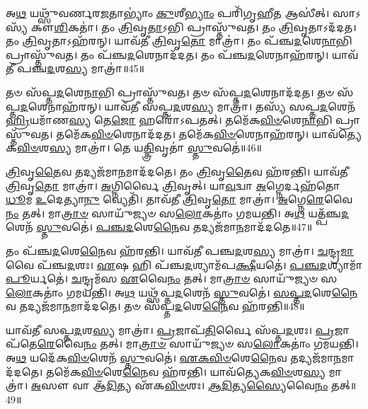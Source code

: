 𑌅\-\ul{𑌥} 𑌯𑌥𑍍𑌸𑍁᳴𑌵𑌰𑍍𑌣𑌰\-\ul{𑌜}\-𑌤𑌾𑌭𑍍𑌯𑌾𑌂॑ \ul{𑌕𑍁}\-𑌶𑍀\-\ul{𑌭𑍍𑌯𑌾𑌂} 𑌪𑌰𑌿᳴𑌗𑍃𑌹𑍀\-\ul{𑌤} 𑌆𑌸𑍀॑𑌤𑍍।
𑌸𑌾𑌽𑌸𑍍𑌯᳴ 𑌕𑍗\-\ul{𑌶𑌿}\-𑌕𑌤𑌾॑।
𑌤𑌂 \ul{𑌤𑍍𑌰𑌿}\-𑌵𑍃\-\ul{𑌤𑌾}\-𑌽𑌭𑌿 𑌪𑍍𑌰𑌾𑌸𑍍𑌤𑍁᳴𑌵𑌤।
𑌤𑌂 \ul{𑌤𑍍𑌰𑌿}\-𑌵𑍃𑌤𑌾\-𑌽𑌦᳴𑌦𑌤।
𑌤𑌂 \ul{𑌤𑍍𑌰𑌿}\-𑌵𑍃𑌤𑌾\-𑌽𑌹᳴𑌰𑌨𑍍।
𑌯𑌾𑌵᳴𑌤𑍀 \ul{𑌤𑍍𑌰𑌿}\-𑌵𑍃\-\ul{𑌤𑍋} 𑌮𑌾𑌤𑍍𑌰𑌾॑।
𑌤𑌂 𑌪᳴𑌞𑍍𑌚\-\ul{𑌦}\-𑌶𑍇\-\ul{𑌨𑌾}\-𑌭𑌿 𑌪𑍍𑌰𑌾𑌸𑍍𑌤𑍁᳴𑌵𑌤।
𑌤𑌂 𑌪᳴𑌞𑍍𑌚\-\ul{𑌦}\-𑌶𑍇𑌨𑌾𑌦᳴𑌦𑌤।
𑌤𑌂 𑌪᳴𑌞𑍍𑌚\-\ul{𑌦}\-𑌶𑍇𑌨𑌾𑌹᳴𑌰𑌨𑍍।
𑌯𑌾𑌵᳴𑌤𑍀 𑌪𑌞𑍍𑌚\-\ul{𑌦}\-𑌶\-\ul{𑌸𑍍𑌯} 𑌮𑌾𑌤𑍍𑌰𑌾॑॥45॥

𑌤𑍞 𑌸᳴𑌪𑍍𑌤\-\ul{𑌦}\-𑌶𑍇\-\ul{𑌨𑌾}\-𑌭𑌿 𑌪𑍍𑌰𑌾𑌸𑍍𑌤𑍁᳴𑌵𑌤।
𑌤𑍞 𑌸᳴𑌪𑍍𑌤\-\ul{𑌦}\-𑌶𑍇𑌨𑌾𑌦᳴𑌦𑌤।
𑌤𑍞 𑌸᳴𑌪𑍍𑌤\-\ul{𑌦}\-𑌶𑍇𑌨𑌾𑌹᳴𑌰𑌨𑍍।
𑌯𑌾𑌵᳴𑌤𑍀 𑌸𑌪𑍍𑌤\-\ul{𑌦}\-𑌶\-\ul{𑌸𑍍𑌯} 𑌮𑌾𑌤𑍍𑌰𑌾॑।
𑌤𑌸𑍍𑌯᳴ 𑌸𑌪𑍍𑌤\-\ul{𑌦}\-𑌶𑍇𑌨᳴ \ul{𑌹𑍍𑌰𑌿}\-𑌯𑌮𑌾᳴𑌣\-\ul{𑌸𑍍𑌯} 𑌤𑍇\-\ul{𑌜𑍋} 𑌹𑌰𑍋᳴\-𑌽𑌪𑌤𑌤𑍍।
𑌤𑌮𑍇᳴𑌕\-\ul{𑌵𑌿}\-\-\ul{𑍞}\-𑌶𑍇\-\ul{𑌨𑌾}\-𑌭𑌿 𑌪𑍍𑌰𑌾𑌸𑍍𑌤𑍁᳴𑌵𑌤।
𑌤𑌮𑍇᳴𑌕\-\ul{𑌵𑌿}\-\-\ul{𑍞}\-𑌶𑍇𑌨𑌾𑌦᳴𑌦𑌤।
𑌤𑌮𑍇᳴𑌕\-\ul{𑌵𑌿}\-\-\ul{𑍞}\-𑌶𑍇𑌨𑌾𑌹᳴𑌰𑌨𑍍।
𑌯𑌾𑌵᳴𑌤𑍍𑌯𑍇𑌕\-\ul{𑌵𑌿}\-\-\ul{𑍞}\-𑌶\-\ul{𑌸𑍍𑌯} 𑌮𑌾𑌤𑍍𑌰𑌾॑।
𑌤𑍇 𑌯\-\ul{𑌤𑍍𑌤𑍍𑌰𑌿}\-𑌵𑍃𑌤𑌾॑ \ul{𑌸𑍍𑌤𑍁}\-𑌵𑌤𑍇॑॥46॥

\-\ul{𑌤𑍍𑌰𑌿}\-𑌵𑍃\-\ul{𑌤𑍈}\-𑌵 𑌤𑌦𑍍𑌯𑌜᳴𑌮𑌾\-\ul{𑌨}\-𑌮𑌾𑌦᳴𑌦𑌤𑍇।
𑌤𑌂 \ul{𑌤𑍍𑌰𑌿}\-𑌵𑍃\-\ul{𑌤𑍈}\-𑌵 𑌹᳴𑌰𑌨𑍍𑌤𑌿।
𑌯𑌾𑌵᳴𑌤𑍀 \ul{𑌤𑍍𑌰𑌿}\-𑌵𑍃\-\ul{𑌤𑍋} 𑌮𑌾𑌤𑍍𑌰𑌾॑।
\-\ul{𑌅}\-𑌗𑍍𑌨𑌿𑌰𑍍𑌵𑍈 \ul{𑌤𑍍𑌰𑌿}\-𑌵𑍃𑌤𑍍।
𑌯𑌾\-\ul{𑌵}\-𑌦𑍍𑌵𑌾 \ul{𑌅}\-𑌗𑍍𑌨𑍇𑌰𑍍𑌦𑌹᳴𑌤𑍋 \ul{𑌧𑍂}\-𑌮 \ul{𑌉}\-𑌦𑍇𑌤𑍍𑌯𑌾\-\ul{𑌨𑍁} 𑌵𑍍𑌯𑍇𑌤𑌿᳴।
𑌤𑌾𑌵᳴𑌤𑍀 \ul{𑌤𑍍𑌰𑌿}\-𑌵𑍃\-\ul{𑌤𑍋} 𑌮𑌾𑌤𑍍𑌰𑌾॑।
\-\ul{𑌅}\-𑌗𑍍𑌨𑍇\-\ul{𑌰𑍇}\-𑌵𑍈\-\ul{𑌨𑌂} 𑌤𑌤𑍍।
𑌮𑌾\-\ul{𑌤𑍍𑌰𑌾}\-\-\ul{𑍞} 𑌸𑌾𑌯𑍁᳴𑌜𑍍𑌯𑍞 𑌸\-\ul{𑌲𑍋}\-𑌕𑌤𑌾𑌂॑ 𑌗𑌮𑌯𑌨𑍍𑌤𑌿।
𑌅\-\ul{𑌥} 𑌯𑌤𑍍𑌪᳴𑌞𑍍𑌚\-\ul{𑌦}\-𑌶𑍇𑌨᳴ \ul{𑌸𑍍𑌤𑍁}\-𑌵𑌤𑍇॑।
\-\ul{𑌪}\-\-\ul{𑌞𑍍𑌚}\-\-\ul{𑌦}\-𑌶𑍇\-\ul{𑌨𑍈}\-𑌵 𑌤𑌦𑍍𑌯𑌜᳴𑌮𑌾\-\ul{𑌨}\-𑌮𑌾𑌦᳴𑌦𑌤𑍇॥47॥

𑌤𑌂 𑌪᳴𑌞𑍍𑌚\-\ul{𑌦}\-𑌶𑍇\-\ul{𑌨𑍈}\-𑌵 𑌹᳴𑌰𑌨𑍍𑌤𑌿।
𑌯𑌾𑌵᳴𑌤𑍀 𑌪𑌞𑍍𑌚\-\ul{𑌦}\-𑌶\-\ul{𑌸𑍍𑌯} 𑌮𑌾𑌤𑍍𑌰𑌾॑।
\-\ul{𑌚}\-𑌨𑍍𑌦𑍍𑌰\-\ul{𑌮𑌾} 𑌵𑍈 𑌪᳴𑌞𑍍𑌚\-\ul{𑌦}\-𑌶𑌃।
\-\ul{𑌏}\-𑌷 𑌹𑌿 𑌪᳴𑌞𑍍𑌚\-\ul{𑌦}\-𑌶𑍍𑌯𑌾𑌮᳴𑌪\-\ul{𑌕𑍍𑌷𑍀}\-𑌯𑌤𑍇॑।
\-\ul{𑌪}\-\-\ul{𑌞𑍍𑌚}\-\-\ul{𑌦}\-𑌶𑍍𑌯𑌾𑌮𑌾᳴\-\ul{𑌪𑍂}\-𑌰𑍍𑌯𑌤𑍇॑।
\-\ul{𑌚}\-𑌨𑍍𑌦𑍍𑌰𑌮᳴𑌸 \ul{𑌏}\-𑌵𑍈\-\ul{𑌨𑌂} 𑌤𑌤𑍍।
𑌮𑌾\-\ul{𑌤𑍍𑌰𑌾}\-\-\ul{𑍞} 𑌸𑌾𑌯𑍁᳴𑌜𑍍𑌯𑍞 𑌸\-\ul{𑌲𑍋}\-𑌕𑌤𑌾𑌂॑ 𑌗𑌮𑌯𑌨𑍍𑌤𑌿।
𑌅\-\ul{𑌥} 𑌯𑌥𑍍𑌸᳴𑌪𑍍𑌤\-\ul{𑌦}\-𑌶𑍇𑌨᳴ \ul{𑌸𑍍𑌤𑍁}\-𑌵𑌤𑍇॑।
\-\ul{𑌸}\-\-\ul{𑌪𑍍𑌤}\-\-\ul{𑌦}\-𑌶𑍇\-\ul{𑌨𑍈}\-𑌵 𑌤𑌦𑍍𑌯𑌜᳴𑌮𑌾\-\ul{𑌨}\-𑌮𑌾𑌦᳴𑌦𑌤𑍇।
𑌤𑍞 𑌸᳴𑌪𑍍𑌤\-\ul{𑌦}\-𑌶𑍇\-\ul{𑌨𑍈}\-𑌵 𑌹᳴𑌰𑌨𑍍𑌤𑌿॥48॥

𑌯𑌾𑌵᳴𑌤𑍀 𑌸𑌪𑍍𑌤\-\ul{𑌦}\-𑌶\-\ul{𑌸𑍍𑌯} 𑌮𑌾𑌤𑍍𑌰𑌾॑।
\-\ul{𑌪𑍍𑌰}\-𑌜𑌾𑌪᳴\-\ul{𑌤𑌿}\-𑌰𑍍𑌵𑍈 𑌸᳴𑌪𑍍𑌤\-\ul{𑌦}\-𑌶𑌃।
\-\ul{𑌪𑍍𑌰}\-𑌜𑌾𑌪᳴𑌤𑍇\-\ul{𑌰𑍇}\-𑌵𑍈\-\ul{𑌨𑌂} 𑌤𑌤𑍍।
𑌮𑌾\-\ul{𑌤𑍍𑌰𑌾}\-\-\ul{𑍞} 𑌸𑌾𑌯𑍁᳴𑌜𑍍𑌯𑍞 𑌸\-\ul{𑌲𑍋}\-𑌕𑌤𑌾𑌂॑ 𑌗𑌮𑌯𑌨𑍍𑌤𑌿।
𑌅\-\ul{𑌥} 𑌯𑌦𑍇᳴𑌕\-\ul{𑌵𑌿}\-\-\ul{𑍞}\-𑌶𑍇𑌨᳴ \ul{𑌸𑍍𑌤𑍁}\-𑌵𑌤𑍇॑।
\-\ul{𑌏}\-\-\ul{𑌕}\-\-\ul{𑌵𑌿}\-\-\ul{𑍞}\-𑌶𑍇\-\ul{𑌨𑍈}\-𑌵 𑌤𑌦𑍍𑌯𑌜᳴𑌮𑌾\-\ul{𑌨}\-𑌮𑌾𑌦᳴𑌦𑌤𑍇।
𑌤𑌮𑍇᳴𑌕\-\ul{𑌵𑌿}\-\-\ul{𑍞}\-𑌶𑍇\-\ul{𑌨𑍈}\-𑌵 𑌹᳴𑌰𑌨𑍍𑌤𑌿।
𑌯𑌾𑌵᳴𑌤𑍍𑌯𑍇𑌕\-\-\ul{𑌵𑌿}\-\-\ul{𑍞}\-𑌶\-\ul{𑌸𑍍𑌯} 𑌮𑌾𑌤𑍍𑌰𑌾॑।
\-\ul{𑌅}\-𑌸𑍗 𑌵𑌾 𑌆᳴\-\ul{𑌦𑌿}\-𑌤𑍍𑌯 𑌏᳴𑌕\-\ul{𑌵𑌿}\-\-\ul{𑍞}\-𑌶𑌃।
\-\ul{𑌆}\-\-\ul{𑌦𑌿}\-𑌤𑍍𑌯\-\ul{𑌸𑍍𑌯𑍈}\-𑌵𑍈\-\ul{𑌨𑌂} 𑌤𑌤𑍍॥49॥


